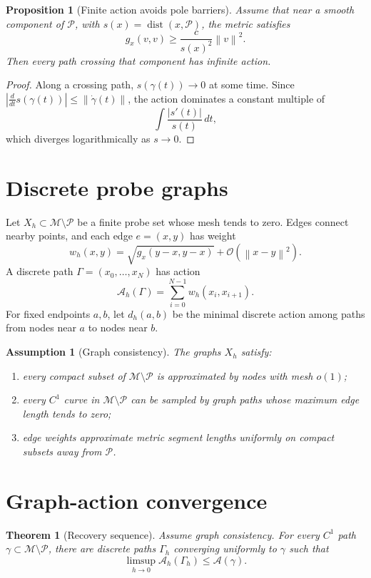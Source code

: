 \documentclass[11pt]{article}
\newtheorem{assumption}[definition]{Assumption}
\newtheorem{theorem}[definition]{Theorem}
\newtheorem{proposition}[definition]{Proposition}
\newcommand{\A}{\mathcal A}
\newcommand{\M}{\mathcal M}
\newcommand{\Pset}{\mathcal P}
\newcommand{\Oterm}{\mathcal O}
\newcommand{\norm}[1]{\left\lVert #1\right\rVert}
\DeclareMathOperator{\dist}{dist}
\begin{document}
\begin{proposition}[Finite action avoids pole barriers]\label{prop:avoid}
Assume that near a smooth component of \(\Pset\), with \(s(x)=\dist(x,\Pset)\), the metric satisfies
\[
        g_x(v,v)\ge \frac{c}{s(x)^2}\norm{v}^2.
\]
Then every path crossing that component has infinite action.
\end{proposition}

\begin{proof}
Along a crossing path, \(s(\gamma(t))\to0\) at some time. Since \(|\frac{d}{dt}s(\gamma(t))|\le \norm{\dot\gamma(t)}\), the action dominates a constant multiple of
\[
        \int \frac{|s'(t)|}{s(t)}\,dt,
\]
which diverges logarithmically as \(s\to0\).
\end{proof}

\section{Discrete probe graphs}

Let \(X_h\subset\M\setminus\Pset\) be a finite probe set whose mesh tends to zero. Edges connect nearby points, and each edge \(e=(x,y)\) has weight
\[
        w_h(x,y)=\sqrt{g_x(y-x,y-x)}+\Oterm(\norm{x-y}^2).
\]
A discrete path \(\Gamma=(x_0,\ldots,x_N)\) has action
\[
        \A_h(\Gamma)=\sum_{i=0}^{N-1} w_h(x_i,x_{i+1}).
\]
For fixed endpoints \(a,b\), let \(d_h(a,b)\) be the minimal discrete action among paths from nodes near \(a\) to nodes near \(b\).

\begin{assumption}[Graph consistency]\label{ass:graph}
The graphs \(X_h\) satisfy:
\begin{enumerate}[label=(\roman*)]
\item every compact subset of \(\M\setminus\Pset\) is approximated by nodes with mesh \(o(1)\);
\item every \(C^1\) curve in \(\M\setminus\Pset\) can be sampled by graph paths whose maximum edge length tends to zero;
\item edge weights approximate metric segment lengths uniformly on compact subsets away from \(\Pset\).
\end{enumerate}
\end{assumption}

\section{Graph-action convergence}

\begin{theorem}[Recovery sequence]\label{thm:recovery}
Assume graph consistency. For every \(C^1\) path \(\gamma\subset\M\setminus\Pset\), there are discrete paths \(\Gamma_h\) converging uniformly to \(\gamma\) such that
\[
        \limsup_{h\to0}\A_h(\Gamma_h)\le \A(\gamma).
\]
\end{theorem}
\end{document}
